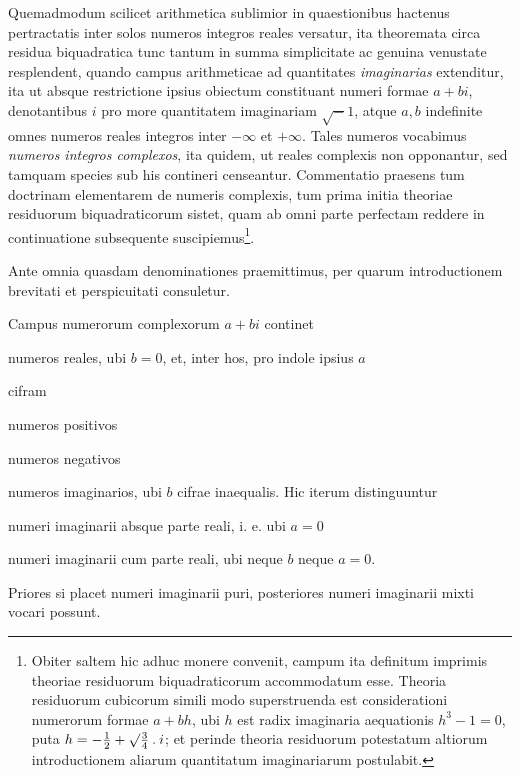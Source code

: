 Quemadmodum scilicet arithmetica sublimior in quaestionibus hactenus pertractatis inter solos numeros integros reales versatur, ita theoremata circa residua biquadratica tunc tantum in summa simplicitate ac genuina venustate resplendent, quando campus arithmeticae ad quantitates \emph{imaginarias} extenditur, ita ut absque restrictione ipsius obiectum constituant numeri formae $a+bi$, denotantibus $i$ pro more quantitatem imaginariam $\surd-1$, atque $a,b$ indefinite omnes numeros reales integros inter $-\infty$ et $+\infty$. Tales numeros vocabimus \emph{numeros integros complexos}, ita quidem, ut reales complexis non opponantur, sed tamquam species sub his contineri censeantur. Commentatio praesens tum doctrinam elementarem de numeris complexis, tum prima initia theoriae residuorum biquadraticorum sistet, quam ab omni parte perfectam reddere in continuatione subsequente suscipiemus\begingroup\renewcommand{\thefootnote}{*)}\footnote{Obiter saltem hic adhuc monere convenit, campum ita definitum imprimis theoriae residuorum biquadraticorum accommodatum esse. Theoria residuorum cubicorum simili modo superstruenda est considerationi numerorum formae $a+bh$, ubi $h$ est radix imaginaria aequationis $h^3-1=0$, puta $h=-\frac12+\surd\frac34\mathbin{.} i$; et perinde theoria residuorum potestatum altiorum introductionem aliarum quantitatum imaginariarum postulabit.}\endgroup.

Ante omnia quasdam denominationes praemittimus, per quarum introductionem brevitati et perspicuitati consuletur.

Campus numerorum complexorum $a+bi$ continet
\begin{list}{}{\setlength{\leftmargin}{1.6em}\setlength{\labelwidth}{1.4em}\setlength{\labelsep}{.2em}}
\item[I.] numeros reales, ubi $b=0$, et, inter hos, pro indole ipsius $a$
\begin{list}{}{\setlength{\leftmargin}{1.7em}\setlength{\labelwidth}{1.5em}\setlength{\labelsep}{.2em}}
\item[1)] cifram
\item[2)] numeros positivos
\item[3)] numeros negativos
\end{list}
\item[II.] numeros imaginarios, ubi $b$ cifrae inaequalis. Hic iterum distinguuntur
\begin{list}{}{\setlength{\leftmargin}{1.7em}\setlength{\labelwidth}{1.5em}\setlength{\labelsep}{.2em}}
\item[1)] numeri imaginarii absque parte reali, i. e. ubi $a=0$
\item[2)] numeri imaginarii cum parte reali, ubi neque $b$ neque $a=0$.
\end{list}
\end{list}
Priores si placet numeri imaginarii puri, posteriores numeri imaginarii mixti vocari possunt.

